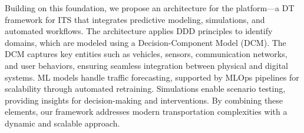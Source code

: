 Building on this foundation, we propose an architecture for the \digit platform—a DT framework for ITS that integrates predictive modeling, simulations, and automated workflows. The architecture applies DDD principles to identify domains, which are modeled using a Decision-Component Model (DCM). The DCM captures key entities such as vehicles, sensors, communication networks, and user behaviors, ensuring seamless integration between physical and digital systems. ML models handle traffic forecasting, supported by MLOps pipelines for scalability through automated retraining. Simulations enable scenario testing, providing insights for decision-making and interventions. By combining these elements, our framework addresses modern transportation complexities with a dynamic and scalable approach.
